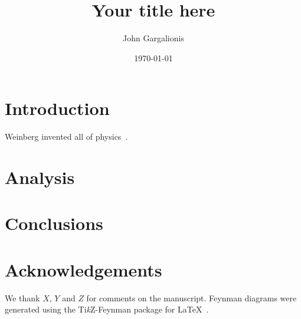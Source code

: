 \documentclass[
reprint,    %
nofootinbib %
aps,
prd,
amsmath,
amssymb,
]{revtex4-2}
\begin{document}
\title{Your title here}

\date{\today}

\author{John Gargalionis}


\begin{abstract}
  \lipsum[1]
\end{abstract}

\maketitle

\section*{Introduction}
Weinberg invented all of physics~\cite{Weinberg:1967tq}. \lipsum[2-5]

\section*{Analysis}
\lipsum[6-10]

\section*{Conclusions}
\lipsum[11]

\section*{Acknowledgements}

We thank $X$, $Y$ and $Z$ for comments on the manuscript. Feynman diagrams were
generated using the Ti\textit{k}Z-Feynman package for
\LaTeX~\cite{Ellis:2016jkw}.


\end{document}
